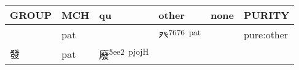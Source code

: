 \documentclass[14pt,a4paper]{scrartcl}
\begin{document}
\begin{longtable}[c]{@{}llllll@{}}
\toprule
\begin{minipage}[b]{0.14\columnwidth}\raggedright\strut
GROUP
\strut\end{minipage} &
\begin{minipage}[b]{0.14\columnwidth}\raggedright\strut
MCH
\strut\end{minipage} &
\begin{minipage}[b]{0.14\columnwidth}\raggedright\strut
qu
\strut\end{minipage} &
\begin{minipage}[b]{0.14\columnwidth}\raggedright\strut
other
\strut\end{minipage} &
\begin{minipage}[b]{0.14\columnwidth}\raggedright\strut
none
\strut\end{minipage} &
\begin{minipage}[b]{0.14\columnwidth}\raggedright\strut
PURITY
\strut\end{minipage}\tabularnewline
\midrule
\endhead
\begin{minipage}[t]{0.14\columnwidth}\raggedright\strut
𣥠
\strut\end{minipage} &
\begin{minipage}[t]{0.14\columnwidth}\raggedright\strut
pat
\strut\end{minipage} &
\begin{minipage}[t]{0.14\columnwidth}\raggedright\strut
\strut\end{minipage} &
\begin{minipage}[t]{0.14\columnwidth}\raggedright\strut
癶\textsuperscript{7676~pat}
\strut\end{minipage} &
\begin{minipage}[t]{0.14\columnwidth}\raggedright\strut
\strut\end{minipage} &
\begin{minipage}[t]{0.14\columnwidth}\raggedright\strut
pure:other
\strut\end{minipage}\tabularnewline
\begin{minipage}[t]{0.14\columnwidth}\raggedright\strut
發
\strut\end{minipage} &
\begin{minipage}[t]{0.14\columnwidth}\raggedright\strut
pat
\strut\end{minipage} &
\begin{minipage}[t]{0.14\columnwidth}\raggedright\strut
廢\textsuperscript{5ee2~pjojH}
\strut\end{minipage} &

\end{longtable}
\end{document}
